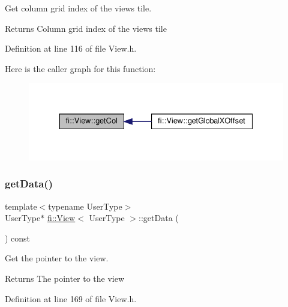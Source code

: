 Get column grid index of the view\textquotesingle{}s tile. 

\begin{DoxyReturn}{Returns}
Column grid index of the view\textquotesingle{}s tile 
\end{DoxyReturn}


Definition at line 116 of file View.\+h.

Here is the caller graph for this function\+:
\nopagebreak
\begin{figure}[H]
\begin{center}
\leavevmode
\includegraphics[width=331pt]{d5/dd4/classfi_1_1View_a40f94b02c882acb3be8623781b912cb2_icgraph}
\end{center}
\end{figure}
\mbox{\label{classfi_1_1View_a8fd719fcea9c7a98cfd0feba96fe5afe}} 
\subsubsection{\texorpdfstring{get\+Data()}{getData()}}
{\footnotesize\ttfamily template$<$typename User\+Type$>$ \\
User\+Type$\ast$ \hyperlink{classfi_1_1View}{fi\+::\+View}$<$ User\+Type $>$\+::get\+Data (\begin{DoxyParamCaption}{ }\end{DoxyParamCaption}) const\hspace{0.3cm}{\ttfamily [inline]}}



Get the pointer to the view. 

\begin{DoxyReturn}{Returns}
The pointer to the view 
\end{DoxyReturn}


Definition at line 169 of file View.\+h.

